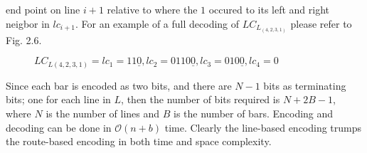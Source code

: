 end point on line $i+1$ relative to where the $1$ occured to its left and 
right neigbor in $lc_{i+1}$. For an example of a full decoding of $LC_{L_{(4,2,3,1)}}$
please refer to Fig. 2.6.\pagebreak
\begin{figure}[!htp]
    \begin{center}
      

    \end{center}
    \caption{$LC_{L(4,2,3,1)}=lc_{1}=11\underline{0},lc_{2}=0110\underline{0},lc_{3}=010\underline{0},lc_{4}=0$}
\end{figure}

Since each bar is encoded as two bits, and there are $N-1$ bits as terminating bits; 
one for each line in $L$, then the number of bits required is $N + 2B -1$, where $N$
is the number of lines and $B$ is the number of bars. Encoding and decoding can be 
done in $\mathcal{O}(n+b)$ time. Clearly the line-based encoding 
trumps the route-based encoding in both time and space complexity.

